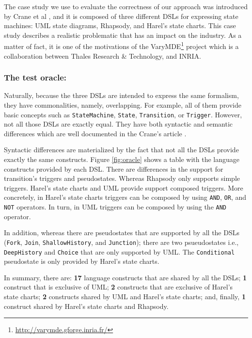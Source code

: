 The case study we use to evaluate the correctness of our approach was introduced by Crane et al \cite{Crane:2007}, and it is composed of three different DSLs for expressing state machines: UML state diagrams, Rhapsody, and Harel's state charts. This case study describes a realistic problematic that has an impact on the industry. As a matter of fact, it is one of the motivations of the VaryMDE\footnote{\url{http://varymde.gforge.inria.fr/}} project which is a collaboration between Thales Research \& Technology, and INRIA.

\vspace{-3mm}
\subsubsection{The test oracle:} Naturally, because the three DSLs are intended to express the same formalism, they have commonalities, namely, overlapping. For example, all of them provide basic concepts such as \texttt{StateMachine}, \texttt{State}, \texttt{Transition}, or \texttt{Trigger}. However, not all those DSLs are exactly equal. They have both syntactic and semantic differences which are well documented in the Crane's article \cite{Crane:2007}.

Syntactic differences are materialized by the fact that not all the DSLs provide exactly the same constructs. Figure \ref{fig:oracle} shows a table with the language constructs provided by each DSL. There are differences in the support for transition's triggers and pseudostates. Whereas Rhapsody only supports simple triggers. Harel's state charts and UML provide support composed triggers. More concretely, in Harel's state charts triggers can be composed by using \texttt{AND}, \texttt{OR}, and \texttt{NOT} operators. In turn, in UML triggers can be composed by using  the \texttt{AND} operator.

In addition, whereas there are pseudostates that are supported by all the DSLs (\texttt{Fork}, \texttt{Join}, \texttt{ShallowHistory}, and \texttt{Junction}); there are two psueudostates i.e., \texttt{DeepHistory} and \texttt{Choice} that are only supported by UML. The \texttt{Conditional} pseudostate is only provided by Harel's state charts.

In summary, there are: \textbf{17} language constructs that are shared by all the DSLs; \textbf{1} construct that is exclusive of UML; \textbf{2} constructs that are exclusive of Harel's state charts; \textbf{2} constructs shared by UML and Harel's state charts; and, finally, \textbf{1} construct shared by Harel's state charts and Rhapsody. 

